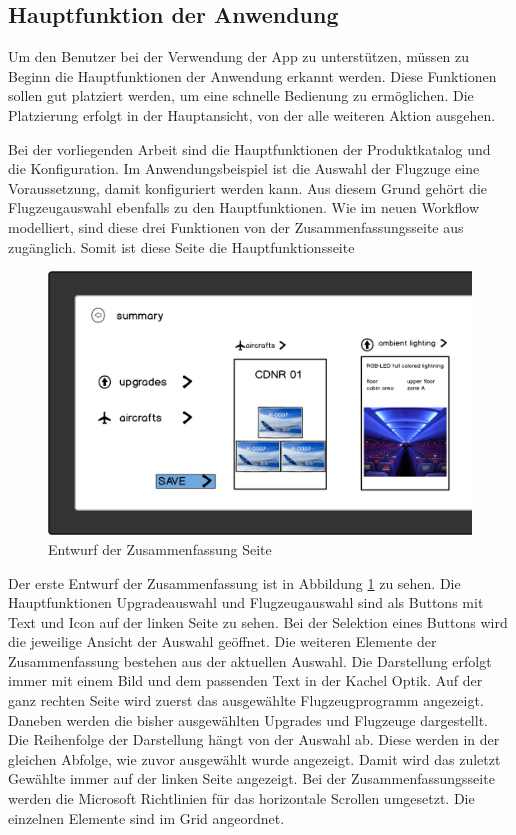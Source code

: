 \subsection{Hauptfunktion der Anwendung}
Um den Benutzer bei der Verwendung der App zu unterstützen, müssen zu Beginn die Hauptfunktionen der Anwendung erkannt werden. Diese Funktionen sollen gut platziert werden, um eine schnelle Bedienung zu ermöglichen. Die Platzierung erfolgt in der Hauptansicht, von der alle weiteren Aktion ausgehen.

Bei der vorliegenden Arbeit sind die Hauptfunktionen der Produktkatalog und die Konfiguration. Im Anwendungsbeispiel ist die Auswahl der Flugzuge eine Voraussetzung, damit konfiguriert werden kann. Aus diesem Grund gehört die Flugzeugauswahl ebenfalls zu den Hauptfunktionen. Wie im neuen Workflow modelliert, sind diese drei Funktionen von der Zusammenfassungsseite aus zugänglich. Somit ist diese Seite die Hauptfunktionsseite\par 
\begin{figure}
\centering
\includegraphics[width=\hsize]{images/summary_entwurf}
\caption{Entwurf der Zusammenfassung Seite}
\label{summarySketch}
\end{figure}

Der erste Entwurf der Zusammenfassung ist in Abbildung \ref{summarySketch} zu sehen. Die Hauptfunktionen Upgradeauswahl und Flugzeugauswahl sind als Buttons mit Text und Icon auf der linken Seite zu sehen. Bei der Selektion eines Buttons wird die jeweilige Ansicht der Auswahl geöffnet. Die weiteren Elemente der Zusammenfassung bestehen aus der aktuellen Auswahl. Die Darstellung erfolgt immer mit einem Bild und dem passenden Text in der Kachel Optik. Auf der ganz rechten Seite wird zuerst das ausgewählte Flugzeugprogramm angezeigt. Daneben werden die bisher ausgewählten Upgrades und Flugzeuge dargestellt. Die Reihenfolge der Darstellung hängt von der Auswahl ab. Diese werden in der gleichen Abfolge, wie zuvor ausgewählt wurde angezeigt. Damit wird das zuletzt Gewählte immer auf der linken Seite angezeigt. Bei der Zusammenfassungsseite werden die Microsoft Richtlinien für das horizontale Scrollen umgesetzt. Die einzelnen Elemente sind im Grid angeordnet.


